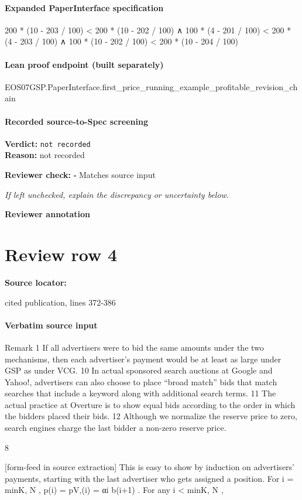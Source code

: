 \documentclass[10pt]{article}
\newcommand{\reviewerbox}{%
  \par\noindent\fbox{\parbox{0.96\linewidth}{\rule{0pt}{0.38in}}}\par
}
\newcommand{\reviewmatch}[1]{%
  \par\noindent\textbf{Reviewer check:} $\square$\; #1\par
  \noindent\emph{If left unchecked, explain the discrepancy or uncertainty below.}\par
}
\begin{document}
\paragraph{Expanded PaperInterface specification}
\begin{ReviewVerbatim}
200 * (10 - 203 / 100) < 200 * (10 - 202 / 100) ∧
  100 * (4 - 201 / 100) < 200 * (4 - 203 / 100) ∧ 100 * (10 - 202 / 100) < 200 * (10 - 204 / 100)
\end{ReviewVerbatim}

\paragraph{Lean proof endpoint (built separately)}\begin{ReviewVerbatim}
EOS07GSP.PaperInterface.first_price_running_example_profitable_revision_chain
\end{ReviewVerbatim}

\paragraph{Recorded source-to-Spec screening}
\textbf{Verdict:} \texttt{not recorded}
\\
\textbf{Reason:} not recorded
\reviewmatch{Matches source input}
\noindent\textbf{Reviewer annotation}\par
\reviewerbox
\clearpage
\hypertarget{source-claim-356b8731e456c635}{}
\section*{Review row 4}
\textbf{Source locator:} {\footnotesize\raggedright cited publication, lines 372-\allowbreak{}386\par}
\paragraph{Verbatim source input}
\begin{ReviewVerbatim}
Remark 1 If all advertisers were to bid the same amounts under the two mechanisms, then each
advertiser’s payment would be at least as large under GSP as under VCG.
10
In actual sponsored search auctions at Google and Yahoo!, advertisers can also choose to place “broad match”
bids that match searches that include a keyword along with additional search terms.
11
The actual practice at Overture is to show equal bids according to the order in which the bidders placed their
bids.
12
Although we normalize the reserve price to zero, search engines charge the last bidder a non-zero reserve price.

8


[form-feed in source extraction]
This is easy to show by induction on advertisers’ payments, starting with the last advertiser
who gets assigned a position. For i = min{K, N }, p(i) = pV,(i) = αi b(i+1) . For any i < min{K, N },
\end{ReviewVerbatim}
\end{document}
